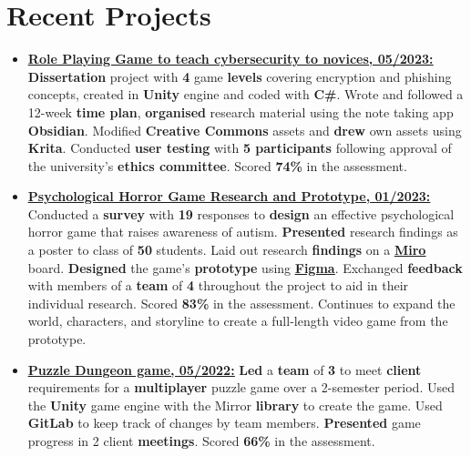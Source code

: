 \documentclass[11pt]{article}
\newcommand{\ulink}[2]{\href{#1}{\uline{#2}}}
\begin{document}
    \section{Recent Projects}
    \begin{itemize}[itemsep=3pt, leftmargin=1em]
        \item \ulink{https://orbit-9j.github.io/Portfolio/\#/Cyberscape:\%20a\%20Cybersecurity\%20RPG}{\textbf{Role Playing Game to teach cybersecurity to novices, 05/2023:}} \textbf{Dissertation} project with \textbf{4} game \textbf{levels} covering encryption and phishing concepts, created in \textbf{Unity} engine and coded with \textbf{C\#}. Wrote and followed a 12-week \textbf{time plan}, \textbf{organised} research material using the note taking app \textbf{Obsidian}. Modified \textbf{Creative Commons} assets and \textbf{drew} own assets using \textbf{Krita}. Conducted \textbf{user testing} with \textbf{5 participants} following approval of the university's \textbf{ethics committee}. Scored \textbf{74\%} in the assessment.
        \item \ulink{https://orbit-9j.github.io/Portfolio/\#/Psychodyssey}{\textbf{Psychological Horror Game Research and Prototype, 01/2023:}} Conducted a \textbf{survey} with \textbf{19} responses to \textbf{design} an effective psychological horror game that raises awareness of autism. \textbf{Presented} research findings as a poster to class of \textbf{50} students. Laid out research \textbf{findings} on a \textbf{\ulink{https://miro.com/app/board/uXjVPMzhjBo=/?share_link_id=722803847643}{Miro}} board. \textbf{Designed} the game's \textbf{prototype} using \textbf{\ulink{https://www.figma.com/file/pyHXkKKN4cn5MtXx4WpAHR/design-cw?t=gjgzJrZM4Dd0YaZP-1}{Figma}}.  Exchanged \textbf{feedback} with members of a \textbf{team} of \textbf{4} throughout the project to aid in their individual research. Scored \textbf{83\%} in the assessment. Continues to expand the world, characters,  and storyline to create a full-length video game from the prototype. 
        \item \ulink{https://orbit-9j.github.io/Portfolio/\#/Puzzle\%20Dungeon:\%20a\%20Multiplayer\%20Puzzle\%20Game}{\textbf{Puzzle Dungeon game, 05/2022:}} \textbf{Led} a \textbf{team} of \textbf{3} to meet \textbf{client} requirements for a \textbf{multiplayer} puzzle game over a 2-semester period. Used the \textbf{Unity} game engine with the Mirror \textbf{library} to create the game. Used \textbf{GitLab} to keep track of changes by team members. \textbf{Presented} game progress in 2 client \textbf{meetings}. Scored \textbf{66\%} in the assessment.
    \end{itemize}
\end{document}
